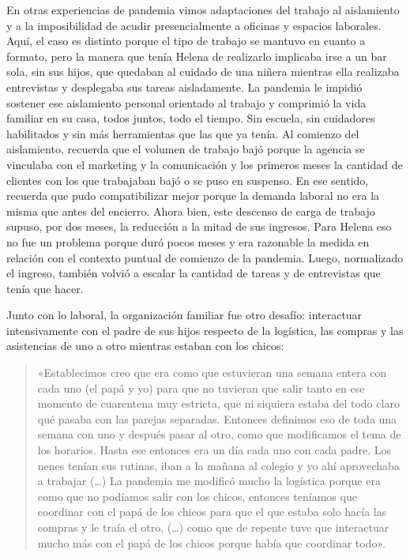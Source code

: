 En otras experiencias de pandemia vimos adaptaciones del trabajo al aislamiento y a la imposibilidad de acudir presencialmente a oficinas y espacios laborales. Aquí, el caso es distinto porque el tipo de trabajo se mantuvo en cuanto a formato, pero la manera que tenía Helena de realizarlo implicaba irse a un bar sola, sin sus hijos, que quedaban al cuidado de una niñera mientras ella realizaba entrevistas y desplegaba sus tareas aisladamente. La pandemia le impidió sostener ese aislamiento personal orientado al trabajo y comprimió la vida familiar en su casa, todos juntos, todo el tiempo. Sin escuela, sin cuidadores habilitados y sin más herramientas que las que ya tenía. Al comienzo del aislamiento, recuerda que el volumen de trabajo bajó porque la agencia se vinculaba con el marketing y la comunicación y los primeros meses la cantidad de clientes con los que trabajaban bajó o se puso en suspenso. En ese sentido, recuerda que pudo compatibilizar mejor porque la demanda laboral no era la misma que antes del encierro. Ahora bien, este descenso de carga de trabajo supuso, por dos meses, la reducción a la mitad de sus ingresos. Para Helena eso no fue un problema porque duró pocos meses y era razonable la medida en relación con el contexto puntual de comienzo de la pandemia. Luego, normalizado el ingreso, también volvió a escalar la cantidad de tareas y de entrevistas que tenía que hacer.

Junto con lo laboral, la organización familiar fue otro desafío: interactuar intensivamente con el padre de sus hijos respecto de la logística, las compras y las asistencias de uno a otro mientras estaban con los chicos:

\begin{quote}
«Establecimos creo que era como que estuvieran una semana entera con cada uno (el papá y yo) para que no tuvieran que salir tanto en ese momento de cuarentena muy estricta, que ni siquiera estaba del todo claro qué pasaba con las parejas separadas. Entonces definimos eso de toda una semana con uno y después pasar al otro, como que modificamos el tema de los horarios. Hasta ese entonces era un día cada uno con cada padre. Los nenes tenían sus rutinas, iban a la mañana al colegio y yo ahí aprovechaba a trabajar (\ldots) La pandemia me modificó mucho la logística porque era como que no podíamos salir con los chicos, entonces teníamos que coordinar con el papá de los chicos para que el que estaba solo hacía las compras y le traía el otro, (\ldots) como que de repente tuve que interactuar mucho más con el papá de los chicos porque había que coordinar todo».
\end{quote}

